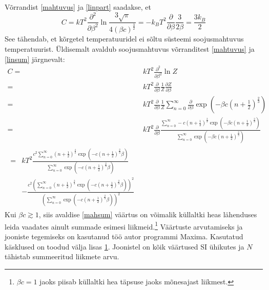 \documentclass{trkut}%
\begin{document}
Võrrandist \eqref{mahtuvus} ja \eqref{linpart} saadakse, et
\begin{equation} \label{intmahtuvus}
    C=kT^2 \frac{\partial^2}{\partial \beta^2} \ln \frac{3\sqrt{\pi}}{4(\beta c)^\frac{3}{2}}=-k_BT^2\frac{\partial}{\partial \beta} \frac{3}{2\beta}=\frac{3k_B}{2}
\end{equation}
See tähendab, et kõrgetel temperatuuridel ei sõltu süsteemi soojusmahtuvus temperatuurist.
Üldisemalt avaldub soojusmahtuvus võrranditest \eqref{mahtuvus} ja \eqref{linsum} järgnevalt:
\begin{align}
    C={}&kT^2 \frac{\partial^2}{\partial \beta^2} \ln Z \nonumber \\
    ={}&kT^2\frac{\partial}{\partial \beta}\frac{1}{Z} \frac{\partial Z}{\partial \beta} \nonumber \\
    ={}&kT^2\frac{\partial}{\partial \beta}\frac{1}{Z} \sum_{n=0}^{\infty} \frac{\partial}{\partial \beta} \exp \left( -\beta c \left(n+\frac{1}{2}\right)^\frac{2}{3} \right) \nonumber \\
    ={}&kT^2\frac{\partial}{\partial \beta} \frac{\sum_{n=0}^{\infty} -c\left(n+\frac{1}{2}\right)^\frac{2}{3} \exp \left( -\beta c \left(n+\frac{1}{2}\right)^\frac{2}{3} \right)}{\sum_{n=0}^{\infty} \exp \left( -\beta c \left(n+\frac{1}{2}\right)^\frac{2}{3} \right)} \nonumber \\
    \begin{split}\label{mahsum}
        ={}&kT^2 \frac{c^2 \sum_{n=0}^\infty \left( n+\frac{1}{2}\right)^\frac{4}{3} \exp \left( -c \left( n+\frac{1}{2} \right)^\frac{2}{3} \beta \right) }{\sum_{n=0}^\infty {{\exp}\left( -c {{\left( n+\frac{1}{2}\right) }^{\frac{2}{3}}} \beta \right)}}  \\
        & - \frac{c^2 \left( \sum_{n=0}^{\infty }{{{\left( n+\frac{1}{2}\right) }^{\frac{2}{3}}} {{ \exp}\left( -c {{\left( n+\frac{1}{2}\right) }^{\frac{2}{3}}} \beta \right)}}\right)^{2}}{{{\left( \sum_{n=0}^{\infty }{ {{\exp}\left( -c {{\left( n+\frac{1}{2}\right) }^{\frac{2}{3}}} \beta \right)}}\right) }^{2}}}
    \end{split}
\end{align}
Kui $\beta c \gtrsim 1$, siis avaldise \eqref{mahsum} väärtus on võimalik küllaltki heas lähenduses leida vaadates ainult summade esimesi liikmeid.\footnote{$\beta c =1$ jaoks piisab küllaltki hea täpsuse jaoks mõnesajast liikmest.}
Väärtuste arvutamiseks ja jooniste tegemiseks on kasutanud töö autor programmi Maxima.
Kasutatud käsklused on toodud välja lisas \hyperref[maximalisa]{1}.
Joonistel on kõik väärtused SI ühikutes ja $N$ tähistab summeeritud liikmete arvu.
\end{document}
